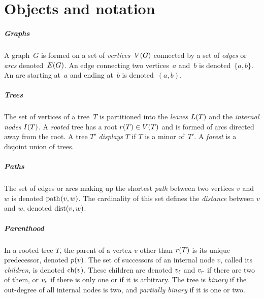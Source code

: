 \twocolumn
\chapter*{Objects and notation}

\paragraph{Graphs}
A graph~\(G\) is formed on a set of \emph{vertices}~\(V(G)\) connected by a set of
\emph{edges} or \emph{arcs} denoted~\(E(G)\).
An edge connecting two vertices~\(a\) and~\(b\) is denoted~\(\{a, b\}\).
An arc starting at~\(a\) and ending at~\(b\) is denoted~\((a, b)\).

\paragraph{Trees}
The set of vertices of a tree~\(T\) is partitioned into the \emph{leaves} \(L(T)\) and the \emph{internal nodes} \(I(T)\).
A \emph{rooted} tree has a root \(r(T) \in V(T)\) and is formed of arcs directed away from the root.
A tree \(T'\) \emph{displays} \(T\) if \(T\) is a minor of~\(T'\).
A \emph{forest} is a disjoint union of trees.

\paragraph{Paths}
The set of edges or arcs making up the shortest \emph{path} between two vertices \(v\) and \(w\) is denoted \(\mathrm{path}_{}(v, w)\).
The cardinality of this set defines the \emph{distance} between \(v\) and \(w\), denoted \(\mathrm{dist}(v, w)\).

\vfill\break
\paragraph{Parenthood}
In a rooted tree \(T\), the parent of a vertex \(v\) other than \(r(T)\) is its unique predecessor, denoted \(p(v)\).
The set of successors of an internal node \(v\), called its \emph{children}, is denoted \(\mathrm{ch}(v)\).
These children are denoted \(v_\mathit{\ell}\) and \(v_r\) if there are two of them, or \(v_c\) if there is only one or if it is arbitrary.
The tree is \emph{binary} if the out-degree of all internal nodes is two, and \emph{partially binary} if it is one or two.

